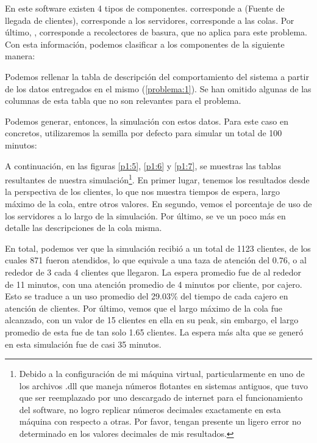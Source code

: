 
En este software existen 4 tipos de componentes.  corresponde a  (Fuente de llegada de clientes),  corresponde a los servidores,  corresponde a las colas. Por último, , corresponde a recolectores de basura, que no aplica para este problema. Con esta información, podemos clasificar a los componentes de la siguiente manera:

Podemos rellenar la tabla de descripción del comportamiento del sistema a partir de los datos entregados en el mismo (\ref{problema:1}). Se han omitido algunas de las columnas de esta tabla que no son relevantes para el problema.

Podemos generar, entonces, la simulación con estos datos. Para este caso en concretos, utilizaremos la semilla por defecto para simular un total de 100 minutos:

\clearpage
A continuación, en las figuras \ref{p1:5}, \ref{p1:6} y \ref{p1:7}, se muestras las tablas resultantes de nuestra simulación\footnote{Debido a la configuración de mi máquina virtual, particularmente en uno de los archivos .dll que maneja números flotantes en sistemas antiguos, que tuvo que ser reemplazado por uno descargado de internet para el funcionamiento del software, no logro replicar números decimales exactamente en esta máquina con respecto a otras. Por favor, tengan presente un ligero error no determinado en los valores decimales de mis resultados.}. En primer lugar, tenemos los resultados desde la perspectiva de los clientes, lo que nos muestra tiempos de espera, largo máximo de la cola, entre otros valores. En segundo, vemos el porcentaje de uso de los servidores a lo largo de la simulación. Por último, se ve un poco más en detalle las descripciones de la cola misma.

En total, podemos ver que la simulación recibió a un total de 1123 clientes, de los cuales 871 fueron atendidos, lo que equivale a una taza de atención del $0.76$, o al rededor de 3 cada 4 clientes que llegaron. La espera promedio fue de al rededor de 11 minutos, con una atención promedio de 4 minutos por cliente, por cajero. Esto se traduce a un uso promedio del 29.03\% del tiempo de cada cajero en atención de clientes. Por último, vemos que el largo máximo de la cola fue alcanzado, con un valor de 15 clientes en ella en su peak, sin embargo, el largo promedio de esta fue de tan solo 1.65 clientes. La espera más alta que se generó en esta simulación fue de casi 35 minutos.

